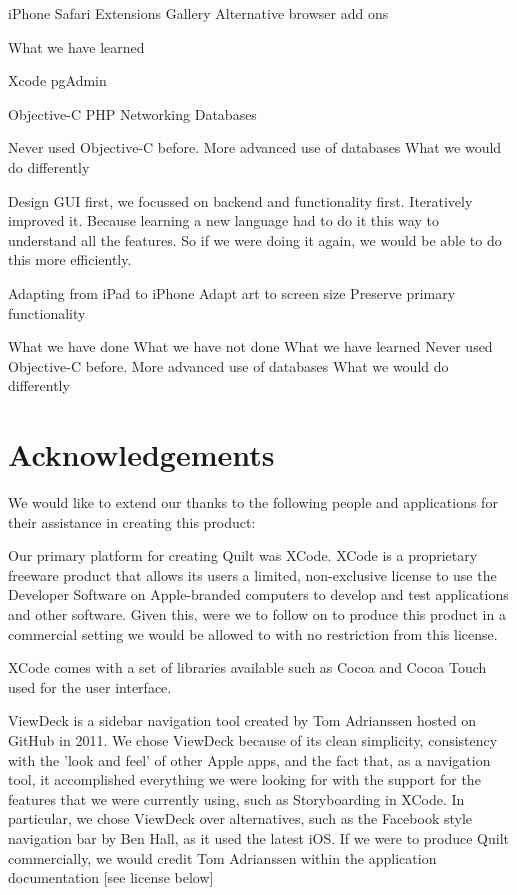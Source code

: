 \documentclass[a4wide, 10pt]{article}
\begin{document}
iPhone
Safari Extensions Gallery
Alternative browser add ons

	What we have learned

Xcode
pgAdmin

Objective-C
PHP
Networking 
Databases


		Never used Objective-C before.
		More advanced use of databases
	What we would do differently

Design GUI first, we focussed on backend and functionality first. Iteratively improved it. Because learning a new language had to do it this way to understand all the features. So if we were doing it again, we would be able to do this more efficiently. 

Adapting from iPad to iPhone
Adapt art to screen size
Preserve primary functionality


	What we have done
	What we have not done
	What we have learned
		Never used Objective-C before.
		More advanced use of databases
	What we would do differently
	
\section{Acknowledgements}

We would like to extend our thanks to the following people and applications for their assistance in creating this product:

Our primary platform for creating Quilt was XCode. XCode is a proprietary freeware product that allows its users a limited, non-exclusive license to use the Developer Software on Apple-branded computers to develop and test applications and other software. Given this, were we to follow on to produce this product in a commercial setting we would be allowed to with no restriction from this license.

XCode comes with a set of libraries available such as Cocoa and Cocoa Touch used for the user interface. 



ViewDeck is a sidebar navigation tool created by Tom Adrianssen hosted on GitHub in 2011. We chose ViewDeck because of its clean simplicity, consistency with the 'look and feel' of other Apple apps, and the fact that, as a navigation tool, it accomplished everything we were looking for with the support for the features that we were currently using, such as Storyboarding in XCode. In particular, we chose ViewDeck over alternatives, such as the Facebook style navigation bar by Ben Hall, as it used the latest iOS. If we were to produce Quilt commercially, we would credit Tom Adrianssen within the application documentation [see license below]
\end{document}

